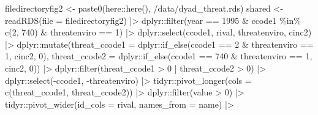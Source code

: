 \documentclass[
  12,
  letterpaper,
  DIV=11,
  numbers=noendperiod]{scrartcl}
\newenvironment{Shaded}{\begin{snugshade}}{\end{snugshade}}
\newcommand{\AttributeTok}[1]{\textcolor[rgb]{0.40,0.45,0.13}{#1}}
\newcommand{\DecValTok}[1]{\textcolor[rgb]{0.68,0.00,0.00}{#1}}
\newcommand{\FunctionTok}[1]{\textcolor[rgb]{0.28,0.35,0.67}{#1}}
\newcommand{\NormalTok}[1]{\textcolor[rgb]{0.00,0.23,0.31}{#1}}
\newcommand{\OtherTok}[1]{\textcolor[rgb]{0.00,0.23,0.31}{#1}}
\newcommand{\SpecialCharTok}[1]{\textcolor[rgb]{0.37,0.37,0.37}{#1}}
\newcommand{\StringTok}[1]{\textcolor[rgb]{0.13,0.47,0.30}{#1}}
\begin{document}
\begin{Shaded}
\begin{Highlighting}[numbers=left,,]
\NormalTok{filedirectoryfig2 }\OtherTok{\textless{}{-}} \FunctionTok{paste0}\NormalTok{(here}\SpecialCharTok{::}\FunctionTok{here}\NormalTok{(), }\StringTok{\textquotesingle{}/data/dyad\_threat.rds\textquotesingle{}}\NormalTok{)}
\NormalTok{shared }\OtherTok{\textless{}{-}} \FunctionTok{readRDS}\NormalTok{(}\AttributeTok{file =}\NormalTok{ filedirectoryfig2) }\SpecialCharTok{|\textgreater{}}
\NormalTok{  dplyr}\SpecialCharTok{::}\FunctionTok{filter}\NormalTok{(year }\SpecialCharTok{==} \DecValTok{1995} \SpecialCharTok{\&}\NormalTok{ ccode1 }\SpecialCharTok{\%in\%} \FunctionTok{c}\NormalTok{(}\DecValTok{2}\NormalTok{, }\DecValTok{740}\NormalTok{) }\SpecialCharTok{\&}\NormalTok{ threatenviro }\SpecialCharTok{==} \DecValTok{1}\NormalTok{) }\SpecialCharTok{|\textgreater{}}
\NormalTok{  dplyr}\SpecialCharTok{::}\FunctionTok{select}\NormalTok{(ccode1, rival, threatenviro, cinc2) }\SpecialCharTok{|\textgreater{}}
\NormalTok{  dplyr}\SpecialCharTok{::}\FunctionTok{mutate}\NormalTok{(}\AttributeTok{threat\_ccode1 =}\NormalTok{ dplyr}\SpecialCharTok{::}\FunctionTok{if\_else}\NormalTok{(ccode1 }\SpecialCharTok{==} \DecValTok{2} \SpecialCharTok{\&}\NormalTok{ threatenviro }\SpecialCharTok{==} \DecValTok{1}\NormalTok{, cinc2, }\DecValTok{0}\NormalTok{),}
                \AttributeTok{threat\_ccode2 =}\NormalTok{ dplyr}\SpecialCharTok{::}\FunctionTok{if\_else}\NormalTok{(ccode1 }\SpecialCharTok{==} \DecValTok{740} \SpecialCharTok{\&}\NormalTok{ threatenviro }\SpecialCharTok{==} \DecValTok{1}\NormalTok{, cinc2, }\DecValTok{0}\NormalTok{)) }\SpecialCharTok{|\textgreater{}}
\NormalTok{  dplyr}\SpecialCharTok{::}\FunctionTok{filter}\NormalTok{(threat\_ccode1 }\SpecialCharTok{\textgreater{}} \DecValTok{0} \SpecialCharTok{|}\NormalTok{ threat\_ccode2 }\SpecialCharTok{\textgreater{}} \DecValTok{0}\NormalTok{) }\SpecialCharTok{|\textgreater{}}
\NormalTok{  dplyr}\SpecialCharTok{::}\FunctionTok{select}\NormalTok{(}\SpecialCharTok{{-}}\NormalTok{ccode1, }\SpecialCharTok{{-}}\NormalTok{threatenviro) }\SpecialCharTok{|\textgreater{}}
\NormalTok{  tidyr}\SpecialCharTok{::}\FunctionTok{pivot\_longer}\NormalTok{(}\AttributeTok{cols =} \FunctionTok{c}\NormalTok{(threat\_ccode1, threat\_ccode2)) }\SpecialCharTok{|\textgreater{}}
\NormalTok{  dplyr}\SpecialCharTok{::}\FunctionTok{filter}\NormalTok{(value }\SpecialCharTok{\textgreater{}} \DecValTok{0}\NormalTok{) }\SpecialCharTok{|\textgreater{}}
\NormalTok{  tidyr}\SpecialCharTok{::}\FunctionTok{pivot\_wider}\NormalTok{(}\AttributeTok{id\_cols =}\NormalTok{ rival, }\AttributeTok{names\_from =}\NormalTok{ name) }\SpecialCharTok{|\textgreater{}}

\end{Highlighting}
\end{Shaded}
\end{document}
